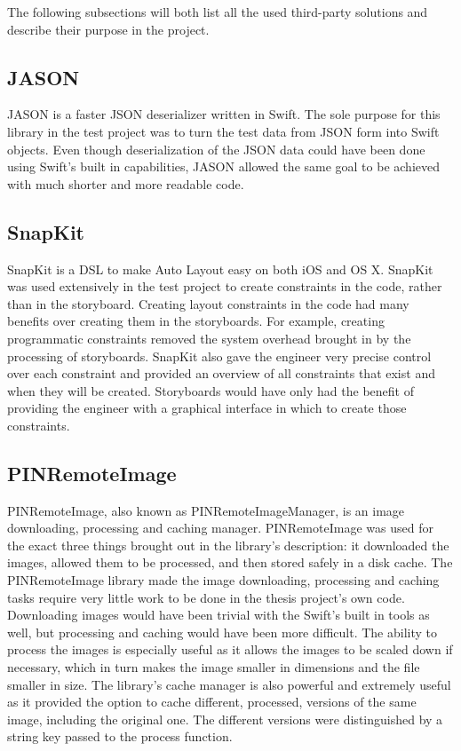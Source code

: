 \documentclass[a4paper,12pt]{article}
\begin{document}
The following subsections will both list all the used third-party solutions and describe their purpose in the project.

\subsection{JASON}
JASON is a faster JSON deserializer written in Swift.\cite{JASON} The sole purpose for this library in the test project was to turn the test data from JSON form into Swift objects. Even though deserialization of the JSON data could have been done using Swift's built in capabilities, JASON allowed the same goal to be achieved with much shorter and more readable code.

\subsection{SnapKit}
SnapKit is a DSL to make Auto Layout easy on both iOS and OS X.\cite{SnapKit} SnapKit was used extensively in the test project to create constraints in the code, rather than in the storyboard. Creating layout constraints in the code had many benefits over creating them in the storyboards. For example, creating programmatic constraints removed the system overhead brought in by the processing of storyboards. SnapKit also gave the engineer very precise control over each constraint and provided an overview of all constraints that exist and when they will be created. Storyboards would have only had the benefit of providing the engineer with a graphical interface in which to create those constraints.

\subsection{PINRemoteImage}
PINRemoteImage, also known as PINRemoteImageManager, is an image downloading, processing and caching manager.\cite{PINRemoteImage} PINRemoteImage was used for the exact three things brought out in the library's description: it downloaded the images, allowed them to be processed, and then stored safely in a disk cache. The PINRemoteImage library made the image downloading, processing and caching tasks require very little work to be done in the thesis project's own code. Downloading images would have been trivial with the Swift's built in tools as well, but processing and caching would have been more difficult. The ability to process the images is especially useful as it allows the images to be scaled down if necessary, which in turn makes the image smaller in dimensions and the file smaller in size. The library's cache manager is also powerful and extremely useful as it provided the option to cache different, processed, versions of the same image, including the original one. The different versions were distinguished by a string key passed to the process function.
\end{document}
